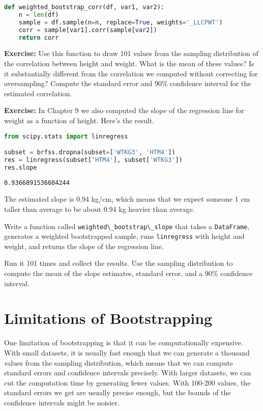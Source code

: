 \begin{lstlisting}[language=Python,style=source]
def weighted_bootstrap_corr(df, var1, var2):
    n = len(df)
    sample = df.sample(n=n, replace=True, weights='_LLCPWT')
    corr = sample[var1].corr(sample[var2])
    return corr
\end{lstlisting}

\textbf{Exercise:} Use this function to draw 101 values from the
sampling distribution of the correlation between height and weight. What
is the mean of these values? Is it substantially different from the
correlation we computed without correcting for oversampling? Compute the
standard error and 90\% confidence interval for the estimated
correlation.

\textbf{Exercise:} In Chapter 9 we also computed the slope of the
regression line for weight as a function of height. Here's the result.

\begin{lstlisting}[language=Python,style=source]
from scipy.stats import linregress

subset = brfss.dropna(subset=['WTKG3', 'HTM4'])
res = linregress(subset['HTM4'], subset['WTKG3'])
res.slope
\end{lstlisting}

\begin{lstlisting}[style=output]
0.9366891536604244
\end{lstlisting}

The estimated slope is 0.94 kg/cm, which means that we expect someone 1
cm taller than average to be about 0.94 kg heavier than average.

Write a function called
\passthrough{\lstinline!weighted\_bootstrap\_slope!} that takes a
\passthrough{\lstinline!DataFrame!}, generates a weighted bootstrapped
sample, runs \passthrough{\lstinline!linregress!} with height and
weight, and returns the slope of the regression line.

Run it 101 times and collect the results. Use the sampling distribution
to compute the mean of the slope estimates, standard error, and a 90\%
confidence interval.

\section{Limitations of
Bootstrapping}\label{limitations-of-bootstrapping}

One limitation of bootstrapping is that it can be computationally
expensive. With small datasets, it is usually fast enough that we can
generate a thousand values from the sampling distribution, which means
that we can compute standard errors and confidence intervals precisely.
With larger datasets, we can cut the computation time by generating
fewer values. With 100-200 values, the standard errors we get are
usually precise enough, but the bounds of the confidence intervals might
be noisier.

